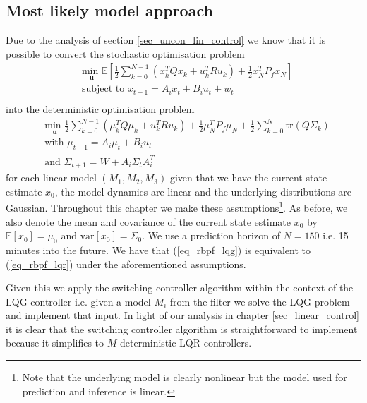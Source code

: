 \subsection{Most likely model approach}
\label{sec_rbpf_control_uncon}
Due to the analysis of section \ref{sec_uncon_lin_control} we know that it is possible to convert the stochastic optimisation problem
\begin{equation}
\begin{aligned}
&\underset{\mathbf{u}}{\text{min }} \mathbb{E}\left[ \frac{1}{2}\sum_{k=0}^{N-1} \left( x_k^TQx_k + u_k^TRu_k \right) + \frac{1}{2}x_N^TP_fx_N \right] \\
& \text{subject to } x_{t+1}=A_ix_t+B_iu_t + w_t\\
\end{aligned}
\label{eq_rbpf_lqg}
\end{equation}
into the deterministic optimisation problem
\begin{equation}
\begin{aligned}
&\underset{\mathbf{u}}{\text{min }} \frac{1}{2}\sum_{k=0}^{N-1} \left( \mu_k^TQ\mu_k + u_k^TRu_k \right) + \frac{1}{2}\mu_N^TP_f\mu_N + \frac{1}{2}\sum_{k=0}^N \text{tr}(Q\Sigma_k) \\
&\text{with } \mu_{t+1} = A_i\mu_t +B_iu_t \\
&\text{and } \Sigma_{t+1} = W+A_i\Sigma_t A_i^T 
\end{aligned}
\label{eq_rbpf_lqr}
\end{equation}
for each linear model $(M_1, M_2, M_3)$ given that we have the current state estimate $x_0$, the model dynamics are linear and the underlying distributions are Gaussian. Throughout this chapter we make these assumptions\footnote{Note that the underlying model is clearly nonlinear but the model used for prediction and inference is linear.}. As before, we also denote the mean and covariance of the current state estimate $x_0$ by $\mathbb{E}[x_0]=\mu_0$ and $\text{var}[x_0]=\Sigma_0$. We use a prediction horizon of $N=150$ i.e. 15 minutes into the future.
We have that (\ref{eq_rbpf_lqg}) is equivalent to (\ref{eq_rbpf_lqr}) under the aforementioned assumptions.

Given this we apply the switching controller algorithm within the context of the LQG controller i.e. given a model $M_i$ from the filter we solve the LQG problem and implement that input. In light of our analysis in chapter \ref{sec_linear_control} it is clear that the switching controller algorithm is straightforward to implement because it simplifies to $M$ deterministic LQR controllers.

